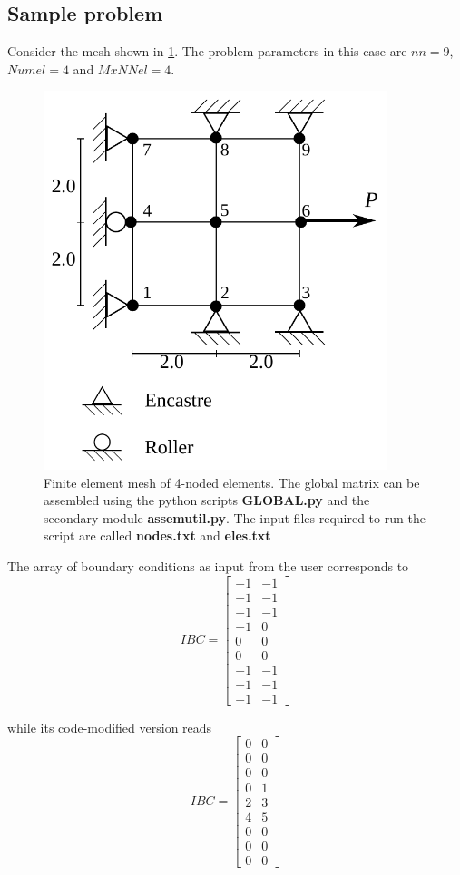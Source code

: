 \subsection*{Sample problem}
Consider the mesh shown in \cref{fig:quad}. The problem parameters in this case are $nn=9$, $Numel=4$ and $MxNNel=4$.

\begin{figure}[h]\label{fig:quad}
\centering
\includegraphics[width=10cm]{mesh2.pdf}
\caption{Finite element mesh of 4-noded elements. The global matrix can be assembled using the python scripts {\bf GLOBAL.py} and the secondary module {\bf assemutil.py}. The input files required to run the script are called {\bf nodes.txt} and {\bf eles.txt}}
\end{figure}



The array of boundary conditions as input from the user corresponds to
\[IBC = \begin{bmatrix}
-1 & -1\\
-1 & -1\\
-1 & -1\\
-1 & 0\\
0 & 0\\
0 & 0\\
-1 & -1\\
-1 & -1\\
-1 & -1
\end{bmatrix}\]

while its code-modified version reads
\[IBC = \begin{bmatrix}
0 & 0\\
0 & 0\\
0 & 0\\
0 & 1\\
2 & 3\\
4 & 5\\
0 & 0\\
0 & 0\\
0 & 0
\end{bmatrix}\]

